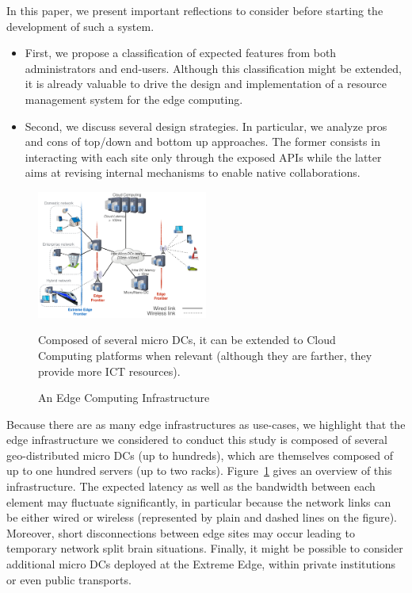 In this paper, we
present important reflections to consider before starting the development of such a system.
\begin{itemize}
\item First, we propose a classification of expected features from
  both administrators and end-users. Although this classification might be extended, it is already valuable to drive the design and implementation of a resource management system for the edge computing.
    \item Second, we discuss several design strategies. In particular, we
  analyze pros and cons of top/down and bottom up approaches. The
  former consists in interacting with each site only through the exposed APIs
  while the latter aims at revising internal mechanisms to enable
  native collaborations.
  \end{itemize}

\begin{figure}[]
  \centering
  \includegraphics[width=0.5\textwidth]{./figures/figure_fog.pdf}
  \caption{An Edge Computing Infrastructure~\cite{7923796}}
  \label{fig:fogedge-archi}
  {\small{Composed of several micro DCs, it can be extended to Cloud Computing platforms when relevant (although they are farther, they provide more ICT resources).}}
\end{figure}

Because there are as many edge infrastructures as use-cases, we highlight that the edge infrastructure
we considered to conduct this study is composed of several geo-distributed micro DCs (up to hundreds), which are themselves composed of up to one hundred
servers (up to two racks).  Figure~\ref{fig:fogedge-archi} gives an overview of this
infrastructure. The expected latency as
well as the bandwidth between each element may fluctuate
significantly, in particular because the network links can be either
wired or wireless (represented by plain and dashed lines on the
figure). Moreover, short disconnections between edge sites may occur leading to temporary network split brain situations.
Finally, it might be possible to consider additional micro DCs deployed at the Extreme Edge, within private institutions or even public transports.


